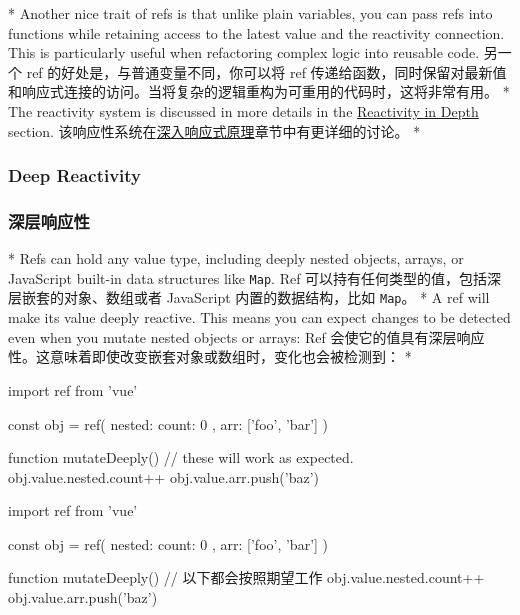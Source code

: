 \begin{paracol}{2}
\switchcolumn[0]*%
Another nice trait of refs is that unlike plain variables, you can pass
refs into functions while retaining access to the latest value and the
reactivity connection. This is particularly useful when refactoring
complex logic into reusable code.
\switchcolumn
另一个 ref 的好处是，与普通变量不同，你可以将 ref
传递给函数，同时保留对最新值和响应式连接的访问。当将复杂的逻辑重构为可重用的代码时，这将非常有用。
\switchcolumn[0]*%
The reactivity system is discussed in more details in the
\href{https://vuejs.org/guide/extras/reactivity-in-depth.html}{Reactivity
in Depth} section.
\switchcolumn
该响应性系统在\href{https://cn.vuejs.org/guide/extras/reactivity-in-depth.html}{深入响应式原理}章节中有更详细的讨论。
\switchcolumn[0]*%
\subsubsection{Deep Reactivity}
\switchcolumn
\subsubsection{深层响应性}
\switchcolumn[0]*%
Refs can hold any value type, including deeply nested objects, arrays,
or JavaScript built-in data structures like \texttt{Map}.
\switchcolumn
Ref 可以持有任何类型的值，包括深层嵌套的对象、数组或者 JavaScript
内置的数据结构，比如 \texttt{Map}。
\switchcolumn[0]*%
A ref will make its value deeply reactive. This means you can expect
changes to be detected even when you mutate nested objects or arrays:
\switchcolumn
Ref
会使它的值具有深层响应性。这意味着即使改变嵌套对象或数组时，变化也会被检测到：
\switchcolumn[0]*%
\begin{codeHtml}
import { ref } from 'vue'

const obj = ref({
    nested: { count: 0 },
    arr: ['foo', 'bar']
})

function mutateDeeply() {
    // these will work as expected.
    obj.value.nested.count++
    obj.value.arr.push('baz')
}
\end{codeHtml}  
\switchcolumn
\begin{codeHtml}
import { ref } from 'vue'

const obj = ref({
    nested: { count: 0 },
    arr: ['foo', 'bar']
})

function mutateDeeply() {
    // 以下都会按照期望工作
    obj.value.nested.count++
    obj.value.arr.push('baz')
}
\end{codeHtml}  
\end{paracol}



